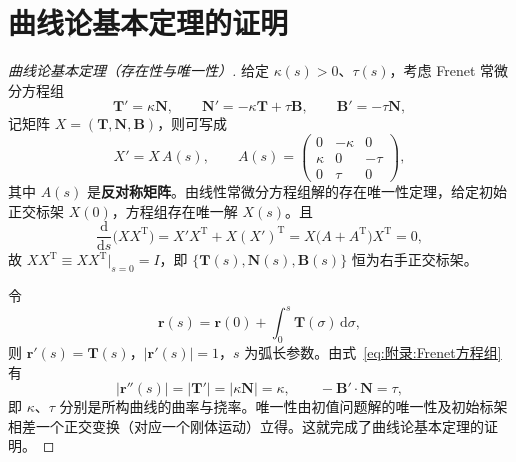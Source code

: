 
\section{曲线论基本定理的证明}

\begin{proof}[曲线论基本定理（存在性与唯一性）]
	给定 $\kappa(s)>0$、$\tau(s)$，考虑 Frenet 常微分方程组
	\begin{equation}
		\mathbf{T}'=\kappa\mathbf{N},\qquad
		\mathbf{N}'=-\kappa\mathbf{T}+\tau\mathbf{B},\qquad
		\mathbf{B}'=-\tau\mathbf{N},
		\label{eq:附录:Frenet方程组}
	\end{equation}
	记矩阵 $X=(\mathbf{T},\mathbf{N},\mathbf{B})$，则可写成
	\begin{equation}
		X'=X\,A(s),\qquad
		A(s)=
		\begin{pmatrix}
			0 & -\kappa & 0\\
			\kappa & 0 & -\tau\\
			0 & \tau & 0
		\end{pmatrix},
		\label{eq:附录:Frenet矩阵}
	\end{equation}
	其中 $A(s)$ 是\textbf{反对称矩阵}。由线性常微分方程组解的存在唯一性定理，给定初始正交标架 $X(0)$，方程组存在唯一解 $X(s)$。且
	\begin{equation}
		\frac{\mathrm{d}}{\mathrm{d}s}\bigl(XX^{\mathrm{T}}\bigr)
		=X'X^{\mathrm{T}}+X(X')^{\mathrm{T}}
		=X\bigl(A+A^{\mathrm{T}}\bigr)X^{\mathrm{T}}=0,
		\label{eq:附录:保正交}
	\end{equation}
	故 $XX^{\mathrm{T}}\equiv XX^{\mathrm{T}}\big|_{s=0}=I$，即 $\{\mathbf{T}(s),\mathbf{N}(s),\mathbf{B}(s)\}$ 恒为右手正交标架。

	令
	\begin{equation}
		\boldsymbol{r}(s)=\boldsymbol{r}(0)+\int_{0}^{s}\mathbf{T}(\sigma)\,\mathrm{d}\sigma,
		\label{eq:附录:曲线构造}
	\end{equation}
	则 $\boldsymbol{r}'(s)=\mathbf{T}(s)$，$\left|\boldsymbol{r}'(s)\right|=1$，$s$ 为弧长参数。由式~\eqref{eq:附录:Frenet方程组} 有
	\begin{equation}
		\left|\boldsymbol{r}''(s)\right|=\left|\mathbf{T}'\right|=\left|\kappa\mathbf{N}\right|=\kappa,\qquad
		-\mathbf{B}'\cdot\mathbf{N}=\tau,
		\label{eq:附录:曲率挠率再现}
	\end{equation}
	即 $\kappa$、$\tau$ 分别是所构曲线的曲率与挠率。唯一性由初值问题解的唯一性及初始标架相差一个正交变换（对应一个刚体运动）立得。这就完成了曲线论基本定理的证明。
\end{proof}

